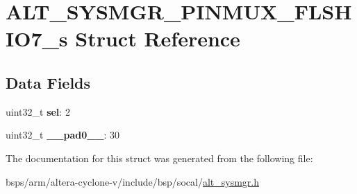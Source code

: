 \hypertarget{structALT__SYSMGR__PINMUX__FLSHIO7__s}{}\section{A\+L\+T\+\_\+\+S\+Y\+S\+M\+G\+R\+\_\+\+P\+I\+N\+M\+U\+X\+\_\+\+F\+L\+S\+H\+I\+O7\+\_\+s Struct Reference}
\label{structALT__SYSMGR__PINMUX__FLSHIO7__s}
\subsection*{Data Fields}
\begin{DoxyCompactItemize}
\item 
\mbox{\label{structALT__SYSMGR__PINMUX__FLSHIO7__s_a9536a7b4e9c3dcc0de4a7bedaa5057ab}} 
uint32\+\_\+t {\bfseries sel}\+: 2
\item 
\mbox{\label{structALT__SYSMGR__PINMUX__FLSHIO7__s_a0010217830a3c1b19489b71d626afc56}} 
uint32\+\_\+t {\bfseries \+\_\+\+\_\+pad0\+\_\+\+\_\+}\+: 30
\end{DoxyCompactItemize}


The documentation for this struct was generated from the following file\+:\begin{DoxyCompactItemize}
\item 
bsps/arm/altera-\/cyclone-\/v/include/bsp/socal/\mbox{\hyperlink{alt__sysmgr_8h}{alt\+\_\+sysmgr.\+h}}\end{DoxyCompactItemize}
